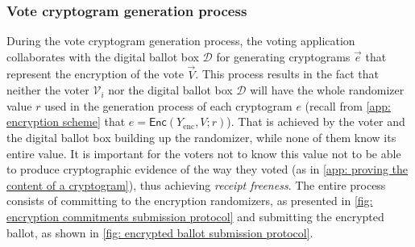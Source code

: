 \subsubsection{Vote cryptogram generation process} \label{sec: vote cryptogram generation process}
During the vote cryptogram generation process, the voting application collaborates with the digital ballot box $\mathcal{D}$ for generating cryptograms $\vec{e}$ that represent the encryption of the vote $\vec{V}$. This process results in the fact that neither the voter $\mathcal{V}_i$ nor the digital ballot box $\mathcal{D}$ will have the whole randomizer value $r$ used in the generation process of each cryptogram $e$ (recall from \cref{app: encryption scheme} that $e = \mathsf{Enc}(Y_\mathrm{enc}, V; r)$). That is achieved by the voter and the digital ballot box building up the randomizer, while none of them know its entire value. It is important for the voters not to know this value not to be able to produce cryptographic evidence of the way they voted (as in \cref{app: proving the content of a cryptogram}), thus achieving \textit{receipt freeness}. The entire process consists of committing to the encryption randomizers, as presented in \cref{fig: encryption commitments submission protocol} and submitting the encrypted ballot, as shown in \cref{fig: encrypted ballot submission protocol}.

